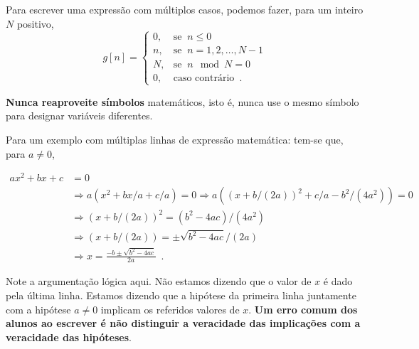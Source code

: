 Para escrever uma expressão com múltiplos casos, podemos fazer, para um inteiro $N$ positivo,
\[
g[n]=
\left\{
\begin{array}{ll}
0,& \mbox{se }~ n\leq 0 \\
n,& \mbox{se }~ n=1,2,\ldots,N-1 \\
N,& \mbox{se }~ n\mod N = 0 \\
0,& \mbox{caso contrário}\enspace.
\end{array}
\right.
\]

\textbf{Nunca reaproveite símbolos} matemáticos, isto é, nunca use o mesmo símbolo para designar variáveis diferentes.

Para um exemplo com múltiplas linhas de expressão matemática: tem-se que, para $a\neq 0$,

\begin{equation}
\begin{split}
ax^2+bx+c &= 0 \\
& \Rightarrow a(x^2+bx/a+c/a) =0 \Rightarrow a((x+b/(2a))^2+c/a-b^2/(4a^2))=0  \\
& \Rightarrow (x+b/(2a))^2=(b^2-4ac)/(4a^2) \\
& \Rightarrow (x+b/(2a))=\pm\sqrt{b^2-4ac}/(2a) \\
& \Rightarrow x=\frac{-b\pm\sqrt{b^2-4ac}}{2a}
\enspace.
\end{split}
\end{equation}

Note a argumentação lógica aqui. Não estamos dizendo que o valor de $x$ é dado pela última linha. Estamos dizendo que a hipótese da primeira linha juntamente com a hipótese $a\neq 0$ implicam os referidos valores de $x$. \textbf{Um erro comum dos alunos ao escrever é não distinguir a veracidade das implicações com a veracidade das hipóteses}.

\clearpage